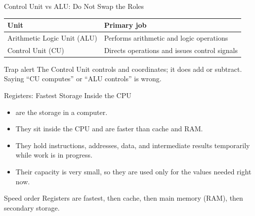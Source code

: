 \documentclass[aspectratio=169]{beamer}
\begin{document}
\begin{frame}{Control Unit vs ALU: Do Not Swap the Roles}
  \begin{center}
    \begin{tabular}{ll}
      \toprule
      \textbf{Unit} & \textbf{Primary job} \\
      \midrule
      Arithmetic Logic Unit (ALU) & Performs arithmetic and logic operations \\
      Control Unit (CU) & Directs operations and issues control signals \\
      \bottomrule
    \end{tabular}
  \end{center}
  \vspace{0.35cm}
  \begin{alertblock}{Trap alert}
    The Control Unit controls and coordinates; it does  add or
    subtract. Saying ``CU computes'' or ``ALU controls'' is wrong.
  \end{alertblock}
\end{frame}

\begin{frame}{Registers: Fastest Storage Inside the CPU}
  \begin{itemize}
    \item {} are the  storage in a
      computer.
    \item They sit inside the CPU and are faster than cache and RAM.
    \item They hold instructions, addresses, data, and intermediate results
      temporarily while work is in progress.
    \item Their capacity is very small, so they are used only for the
      values needed right now.
  \end{itemize}
  \begin{block}{Speed order}
    Registers are fastest, then cache, then main memory (RAM), then
    secondary storage.
  \end{block}
\end{frame}
\end{document}
